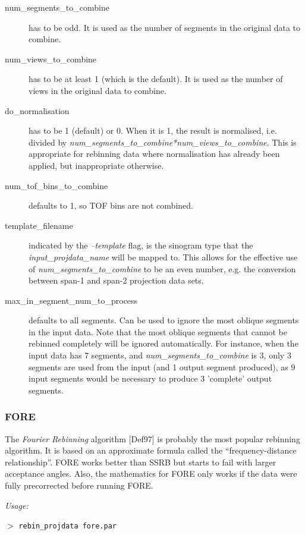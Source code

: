 \documentclass{article}
\newcommand{\cmdline}[1]{\par \noindent $>$ \texttt{#1}\par}
\begin{document}
\begin{description}
\item[num\_segments\_to\_combine] has to be odd. It is used as the 
number of segments in the original data to combine.
\item[num\_views\_to\_combine] has to be at least 1 (which 
is the default). It is used as the number of views in the original 
data to combine.
\item[do\_normalisation] has to be 1 (default) or 0. When it is 1, 
the result is normalised, i.e. divided by \textit{num\_segments\_to\_combine*num\_views\_to\_combine}. 
This is appropriate for rebinning data where normalisation has 
already been applied, but inappropriate otherwise.
\item[num\_tof\_bins\_to\_combine] defaults to 1, so TOF bins are not combined.
\item[template\_filename] indicated by the \textit{--template} flag, 
is the sinogram type that the \textit{input\_projdata\_name} will 
be mapped to. This allows for the effective use of 
\textit{num\_segments\_to\_combine} to be an even number, 
e.g. the conversion between span-1 and span-2 projection data sets. 

\item[max\_in\_segment\_num\_to\_process] defaults to all segments. 
Can be used to ignore the most oblique segments in the input 
data. Note that the most oblique segments that cannot be rebinned 
completely will be ignored automatically. For instance, when 
the input data has 7 segments, and \textit{num\_segments\_to\_combine} is 
3, only 3 segments are used from the input (and 1 output segment 
produced), as 9 input segments would be necessary to produce 
3 'complete' output segments.
\end{description}

\subsubsection{
FORE}
\label{sec:FORE}
The \textit{Fourier Rebinning} algorithm [Def97] is probably the most popular
rebinning algorithm. It is based on an approximate formula called the
``frequency-distance relationship''. FORE works better than SSRB but starts
to fail with larger acceptance angles. Also, the mathematics
for FORE only works if the data were fully precorrected before running FORE.

\textit{Usage:}

\cmdline{rebin\_projdata fore.par}
\end{document}
